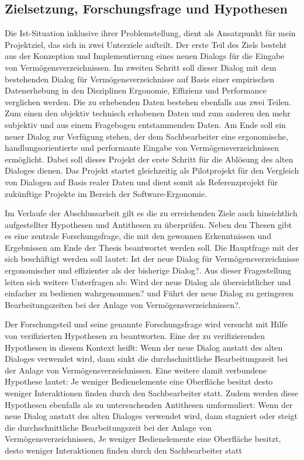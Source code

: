 \subsection{Zielsetzung, Forschungsfrage und Hypothesen}
Die Ist-Situation inklusive ihrer Problemstellung, dient als Ansatzpunkt für mein Projektziel, das sich in zwei Unterziele aufteilt. Der erste Teil des Ziels besteht aus der Konzeption und Implementierung eines neuen Dialogs für die Eingabe von Vermögensverzeichnissen. Im zweiten Schritt soll dieser Dialog mit dem bestehenden Dialog für Vermögensverzeichnisse auf Basis einer empirischen Datenerhebung in den Disziplinen Ergonomie, Effizienz und Performance verglichen werden. Die zu erhebenden Daten bestehen ebenfalls aus zwei Teilen. Zum einen den objektiv technisch erhobenen Daten und zum anderen den mehr subjektiv und aus einem Fragebogen entstammenden Daten. Am Ende soll ein neuer Dialog zur Verfügung stehen, der dem Sachbearbeiter eine ergonomische, handlungsorientierte und performante Eingabe von Vermögensverzeichnissen ermöglicht. Dabei soll dieses Projekt der erste Schritt für die Ablösung des alten Dialoges dienen. Das Projekt startet gleichzeitig als Pilotprojekt für den Vergleich von Dialogen auf Basis realer Daten und dient somit als Referenzprojekt für zukünftige Projekte im Bereich der Software-Ergonomie.

Im Verlaufe der Abschlussarbeit gilt es die zu erreichenden Ziele auch hinsichtlich aufgestellter Hypothesen und Antithesen zu überprüfen. Neben den Thesen gibt es eine zentrale Forschungsfrage, die mit den gewonnen Erkenntnissen und Ergebnissen am Ende der Thesis beantwortet werden soll. Die Hauptfrage mit der sich beschäftigt werden soll lautet: \glqq Ist der neue Dialog für Vermögensverzeichnisse ergonomischer und effizienter als der bisherige Dialog?\grqq{}. Aus dieser Fragestellung leiten sich weitere Unterfragen ab: \glqq Wird der neue Dialog als übersichtlicher und einfacher zu bedienen wahrgenommen?\grqq{} und \glqq Führt der neue Dialog zu geringeren Bearbeitungszeiten bei der Anlage von Vermögensverzeichnissen?\grqq{}.

Der Forschungsteil und seine genannte Forschungsfrage wird versucht mit Hilfe von verifizierten Hypothesen zu beantworten. Eine der zu verifizierenden Hypothesen in diesem Kontext heißt: \glqq Wenn der neue Dialog anstatt des alten Dialoges verwendet wird, dann sinkt die durchschnittliche Bearbeitungszeit bei der Anlage von Vermögensverzeichnissen\grqq{}. Eine weitere damit verbundene Hypothese lautet: \glqq Je weniger Bedienelemente eine Oberfläche besitzt desto weniger Interaktionen finden durch den Sachbearbeiter statt\grqq{}. Zudem werden diese Hypothesen ebenfalls als zu untersuchenden Antithesen umformuliert: \glqq Wenn der neue Dialog anstatt des alten Dialoges verwendet wird, dann stagniert oder steigt die durchschnittliche Bearbeitungszeit bei der Anlage von Vermögensverzeichnissen\grqq{}, \glqq Je weniger Bedienelemente eine Oberfläche besitzt, desto weniger Interaktionen finden durch den Sachbearbeiter statt\grqq{}


